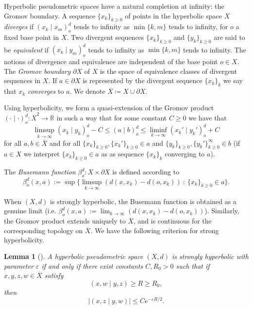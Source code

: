 \documentclass[twoside]{amsart}
\newtheorem{lemma}[theorem]{Lemma}
\theoremstyle{definition}
\numberwithin{equation}{section}
\numberwithin{theorem}{section}
\newcommand{\R}{\mathbb{R}}
\renewcommand{\b}{\beta}
\newcommand{\ep}{\epsilon}
\renewcommand{\epsilon}{\varepsilon}
\newcommand{\gpr}[2]{(#1 \mid#2)}
\newcommand{\ra}{\rightarrow}
\newcommand{\ov}[1]{\overline{#1}}
\begin{document}
Hyperbolic pseudometric spaces have a natural completion at infinity: the Gromov boundary. A sequence $\{x_k\}_{k\geq 0}$ of points in the hyperbolic space $X$ \emph{diverges}
if $\gpr{x_k}{x_m}^d_o$ tends to infinity as $\min\{k, m\}$ tends to infinity, for $o$ a fixed base point in $X$. Two divergent sequences $\{x_k\}_{k\geq 0}$ and $\{y_k\}_{k\geq 0}$ are said to be \emph{equivalent} if $\gpr{x_k}{y_m}^d_o$ tends to infinity as $\min\{k, m\}$ tends to infinity. The notions of divergence and equivalence are independent of the base point $o\in X$. The \emph{Gromov boundary} $\partial X$ of $X$ is the space of equivalence classes of divergent sequences in $X$. If $a \in \partial X$ is represented by the divergent sequence $\{x_k\}_k$ we say that $x_k$ \emph{converges} to $a$. We denote $\ov X \coloneqq X \cup \partial X$.

Using hyperbolicity, we form a quasi-extension of the Gromov product $\gpr{\cdot}{\cdot}^d_o:\ov X^2 \ra \R$
in such a way that for some constant $C\ge 0$ we have that
\begin{equation*}
\limsup_{k \to \infty}\gpr{x_k}{y_k}^d_o-C \le \gpr{a}{b}^d_o \le \liminf_{k \to \infty}\gpr{x_k'}{y_k'}^d_o+C
\end{equation*}
for all $a, b \in \ov{X}$ and for all $\{x_k\}_{k \geq 0}, \{x_k'\}_{k\geq 0} \in a$ and $\{y_k\}_{k\geq 0}, \{y_k'\}_{k\geq 0}^\infty \in b$ (if $a\in X$ we interpret $\{x_k\}_{k \geq 0}\in a$ as as sequence $\{x_k\}_k$ converging to $a$).


The \emph{Busemann function} $\b^d_o:X \times \partial X$ is defined according to
\begin{equation}\label{eq.defbusemann}
  \b^d_o(x, a):=\sup\big\{\limsup_{k \to \infty}(d(x, x_k)-d(o, x_k)) \ : \ \{x_k\}_{k\geq 0} \in a\big\}.
\end{equation}

When $(X,d)$ is strongly hyperbolic, the Busemann function is obtained as a genuine limit (i.e. $\b^d_o(x, a):=\lim_{k \to \infty}(d(x, x_k)-d(o, x_k))$). Similarly, the Gromov product extends uniquely to $\ov X$, and is continuous for the corresponding topology on $\ov{X}$. We have the following criterion for strong hyperbolicity.

\begin{lemma}[{\cite[Lemma~6.2]{nica-spakula}}]\label{lem:nicaspacula}
A hyperbolic pseudometric space $(X,d)$ is strongly hyperbolic with parameter $\ep$ if and only if there exist constants $C,R_0 > 0$ such that if $x,y,z,w\in \ov{X}$ satisfy
\[\gpr{x,w}{y,z}\geq R\geq R_0,\]
then
\[|\gpr{x,z}{y,w}|\leq Ce^{-\ep R/2}.\]  
\end{lemma}
\end{document}

